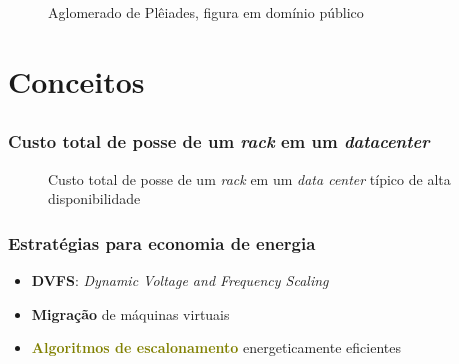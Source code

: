 \documentclass{beamer}
\newcommand{\colorize}[2]{\textbf{\textcolor{#1}{#2}}}
\begin{document}
\begin{frame}
\begin{figure}[htp]
\begin{columns}
\begin{column}{0.5\textwidth}
\begin{center}
	  \caption[map]{Aglomerado de Plêiades, figura em domínio público}
	\end{center}
	\end{column}
\end{columns}

\end{figure}


\end{frame}


\section{Conceitos}
\subsection{}

\begin{frame}
\frametitle{Custo total de posse de um \emph{rack} em um \emph{datacenter}}
\begin{figure}
\caption{Custo total de posse de um \emph{rack} em um \emph{data center} típico 
de alta disponibilidade \cite{rasmussen:tco_data_center}}
\end{figure}
\end{frame}

\begin{frame}
\frametitle{Estratégias para economia de energia}
\begin{itemize}
	\item \colorize{n_red}{DVFS}: \emph{Dynamic Voltage and Frequency Scaling}
	\item \colorize{n_blue}{Migração} de máquinas virtuais
	\item \colorize{olive}{Algoritmos de escalonamento} energeticamente eficientes
\end{itemize}
\end{frame}
\end{document}
